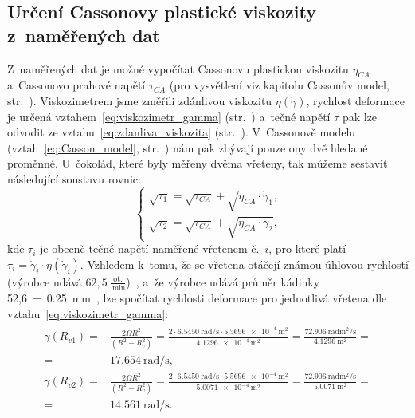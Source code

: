\documentclass[12pt]{article}
\begin{document}
\subsection{Určení Cassonovy plastické viskozity z~naměřených dat}%

Z~naměřených dat je možné vypočítat Cassonovu plastickou viskozitu $\eta_{CA}$ a~Cassonovo prahové napětí $\tau_{CA}$ (pro vysvětlení viz kapitolu Cassonův model, str.~\pageref{sec:Casson}). Viskozimetrem jsme změřili zdánlivou viskozitu $\eta(\dot\gamma)$, rychlost deformace je určená vztahem~\ref{eq:viskozimetr_gamma} (str.~\pageref{eq:viskozimetr_gamma}) a~tečné napětí $\tau$ pak lze odvodit ze vztahu~\ref{eq:zdanliva_viskozita} (str.~\pageref{eq:zdanliva_viskozita}). V~Cassonově modelu (vztah~\ref{eq:Casson_model}, str.~\pageref{eq:Casson_model}) nám pak zbývají pouze ony dvě hledané proměnné. U~čokolád, které byly měřeny dvěma vřeteny, tak můžeme sestavit následující soustavu rovnic:
\begin{equation}
    \begin{cases}
        \sqrt{\tau_1} = \sqrt{\tau_{CA}} + \sqrt{\eta_{CA}\cdot\dot\gamma_1}\text{,}\\
        \sqrt{\tau_2} = \sqrt{\tau_{CA}} + \sqrt{\eta_{CA}\cdot\dot\gamma_2}\text{,}
    \end{cases}
\end{equation}
kde $\tau_i$ je obecně tečné napětí naměřené vřetenem č.~$i$, pro které platí $\tau_i = \dot\gamma_i\cdot\eta(\dot\gamma_i)$. Vzhledem k~tomu, že se vřetena otáčejí známou úhlovou rychlostí (výrobce udává $62,5\:\frac{\text{ot.}}{\SI{}{\minute}}$)~\cite{man:VT-02}, a~že výrobce udává průměr kádinky 52,6\SI{\pm 0,25}{\milli\metre}~\cite{man:VT-02}, lze spočítat rychlosti deformace pro jednotlivá vřetena dle vztahu~\ref{eq:viskozimetr_gamma}:
\begin{align}
    \begin{split}
        \dot\gamma(R_{v1}) =& \frac{2\Omega R^2}{(R^2-R_v^2)} = \frac{2\cdot\SI{6,5450}{\radian\per\second}\cdot\SI{5,5696e-4}{\metre\squared}}{\SI{4,1296e-4}{\metre\squared}} = \frac{\SI{72,906}{\radian\metre\squared\per\second}}{\SI{4,1296}{\metre\squared}} =\\ =& \SI{17,654}{\radian\per\second}\text{,}\\
        \dot\gamma(R_{v2}) =& \frac{2\Omega R^2}{(R^2-R_v^2)} = \frac{2\cdot\SI{6,5450}{\radian\per\second}\cdot\SI{5,5696e-4}{\metre\squared}}{\SI{5,0071e-4}{\metre\squared}} = \frac{\SI{72,906}{\radian\metre\squared\per\second}}{\SI{5,0071}{\metre\squared}} =\\ =& \SI{14,561}{\radian\per\second}\text{.}
    \end{split}
\end{align}
\end{document}
